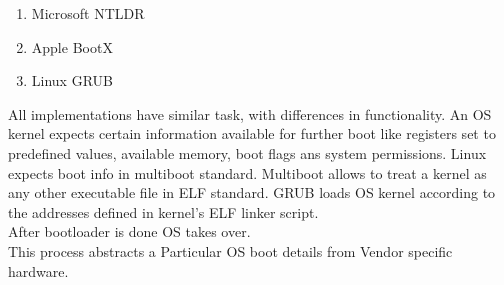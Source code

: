 \documentclass{article}
\begin{document}
\begin{enumerate}[1.]
\item Microsoft NTLDR
\item Apple BootX
\item Linux GRUB
\end{enumerate}

All implementations have similar task, with differences in functionality.
An OS kernel expects certain information available for further boot like registers set
to predefined values, available
memory, boot flags ans system permissions. Linux expects boot info in multiboot
standard. Multiboot allows to treat a kernel as any other executable file in ELF
standard. GRUB loads OS kernel according to the addresses defined in kernel's ELF
linker script.
\\

After bootloader is done OS takes over. \\

This process abstracts a Particular OS boot details from Vendor specific hardware.


\end{document}
